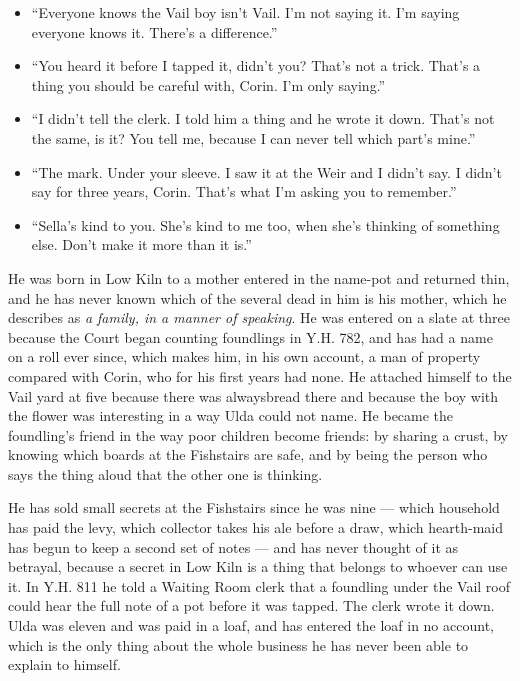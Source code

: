 \documentclass{design/chronicle}
\begin{document}
{\begin{itemize}[leftmargin=1.4em,itemsep=1pt,topsep=3pt,parsep=0pt]
\item “Everyone knows the Vail boy isn’t Vail. I’m not saying it. I’m saying everyone knows it. There’s a difference.”

\item “You heard it before I tapped it, didn’t you? That’s not a trick. That’s a thing you should be careful with, Corin. I’m only saying.”

\item “I didn’t tell the clerk. I told him a thing and he wrote it down. That’s not the same, is it? You tell me, because I can never tell which part’s mine.”

\item “The mark. Under your sleeve. I saw it at the Weir and I didn’t say. I didn’t say for three years, Corin. That’s what I’m asking you to remember.”

\item “Sella’s kind to you. She’s kind to me too, when she’s thinking of something else. Don’t make it more than it is.”

\end{itemize}

He was born in Low Kiln to a mother entered in the name-pot and returned thin, and he has never known which of the several dead in him is his mother, which he describes as \emph{a family, in a manner of speaking}. He was entered on a slate at three because the Court began counting foundlings in Y.H. 782, and has had a name on a roll ever since, which makes him, in his own account, a man of property compared with Corin, who for his first years had none. He attached himself to the Vail yard at five because there was alwaysbread there and because the boy with the flower was interesting in a way Ulda could not name. He became the foundling’s friend in the way poor children become friends: by sharing a crust, by knowing which boards at the Fishstairs are safe, and by being the person who says the thing aloud that the other one is thinking.

He has sold small secrets at the Fishstairs since he was nine — which household has paid the levy, which collector takes his ale before a draw, which hearth-maid has begun to keep a second set of notes — and has never thought of it as betrayal, because a secret in Low Kiln is a thing that belongs to whoever can use it. In Y.H. 811 he told a Waiting Room clerk that a foundling under the Vail roof could hear the full note of a pot before it was tapped. The clerk wrote it down. Ulda was eleven and was paid in a loaf, and has entered the loaf in no account, which is the only thing about the whole business he has never been able to explain to himself.

}
\end{document}
